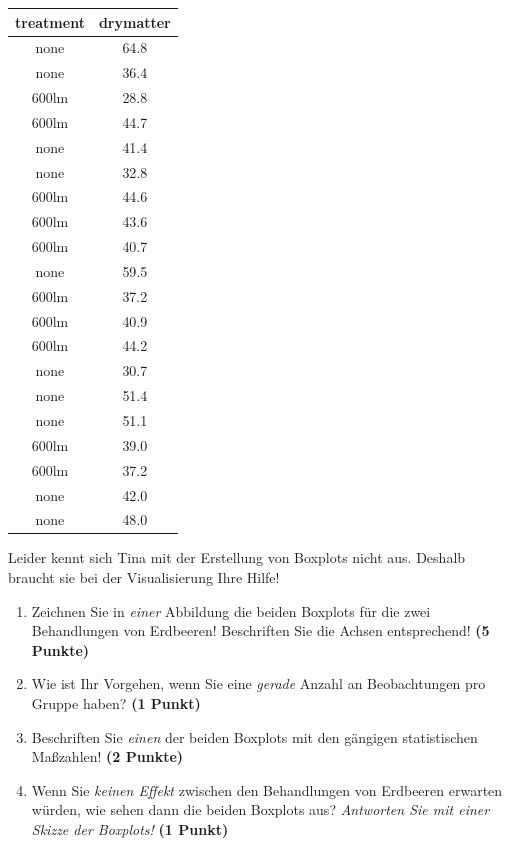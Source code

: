\documentclass[a4paper, 9pt]{scrartcl}\usepackage[]{graphicx}\usepackage[]{xcolor}
\begin{document}
\begin{table}[!h]
\centering
\begin{tabular}{cc}
\toprule
treatment & drymatter\\
\midrule
none & 64.8\\
none & 36.4\\
600lm & 28.8\\
600lm & 44.7\\
none & 41.4\\
\addlinespace
none & 32.8\\
600lm & 44.6\\
600lm & 43.6\\
600lm & 40.7\\
none & 59.5\\
\addlinespace
600lm & 37.2\\
600lm & 40.9\\
600lm & 44.2\\
none & 30.7\\
none & 51.4\\
\addlinespace
none & 51.1\\
600lm & 39.0\\
600lm & 37.2\\
none & 42.0\\
none & 48.0\\
\bottomrule
\end{tabular}
\end{table}



Leider kennt sich Tina mit der Erstellung von Boxplots nicht aus. Deshalb braucht sie bei der Visualisierung Ihre Hilfe!

\begin{enumerate}
\item Zeichnen Sie in \textit{einer} Abbildung die beiden Boxplots für die zwei Behandlungen von Erdbeeren! Beschriften Sie die Achsen entsprechend! \textbf{(5 Punkte)} 
\item Wie ist Ihr Vorgehen, wenn Sie eine \textit{gerade} Anzahl an
  Beobachtungen pro Gruppe haben? \textbf{(1 Punkt)}
\item Beschriften Sie \textit{einen} der beiden Boxplots mit den gängigen
  statistischen Maßzahlen! \textbf{(2 Punkte)}
\item Wenn Sie \textit{keinen Effekt} zwischen den Behandlungen von
  Erdbeeren erwarten würden, wie sehen dann die beiden Boxplots aus?
  \textit{Antworten Sie mit einer Skizze der Boxplots!}
  \textbf{(1 Punkt)}
\end{enumerate} 
\clearpage
\end{document}
